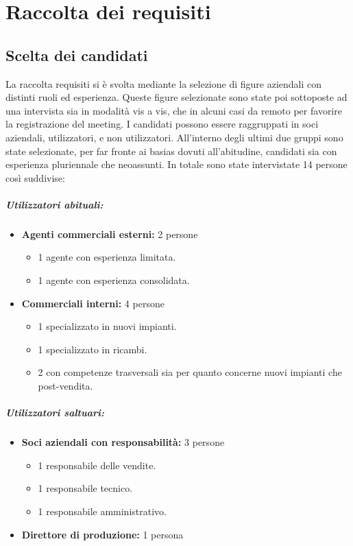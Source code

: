 % 
\chapter{Raccolta dei requisiti}
\section{Scelta dei candidati}
La raccolta requisiti si è svolta mediante la selezione di figure aziendali con distinti ruoli ed esperienza.
Queste figure selezionate sono state poi sottoposte ad una intervista sia in modalità vis a vis,
che in alcuni casi da remoto per favorire la registrazione del meeting.
I candidati possono essere raggruppati in soci aziendali, utilizzatori, e non utilizzatori.
All'interno degli ultimi due gruppi sono state selezionate, per far fronte ai basias dovuti all'abitudine,
 candidati sia con esperienza pluriennale che
neoassunti.
In totale sono state intervistate 14 persone così suddivise:
\paragraph{Utilizzatori abituali:}
\begin{itemize}
    \item \textbf{Agenti commerciali esterni:} 2 persone
    \begin{itemize}
        \item 1 agente con esperienza limitata.
        \item 1 agente con esperienza consolidata.
    \end{itemize}
    \item \textbf{Commerciali interni:} 4 persone
    \begin{itemize}
        \item 1 specializzato in nuovi impianti.
        \item 1 specializzato in ricambi.
        \item 2 con competenze trasversali sia per quanto concerne nuovi impianti che post-vendita.
    \end{itemize}
\end{itemize}
\paragraph{Utilizzatori saltuari:}
\begin{itemize}
    \item \textbf{Soci aziendali con responsabilità:} 3 persone
    \begin{itemize}
        \item 1 responsabile delle vendite.
        \item 1 responsabile tecnico.
        \item 1 responsabile amministrativo.
    \end{itemize}
    \item \textbf{Direttore di produzione:} 1 persona
\end{itemize}

